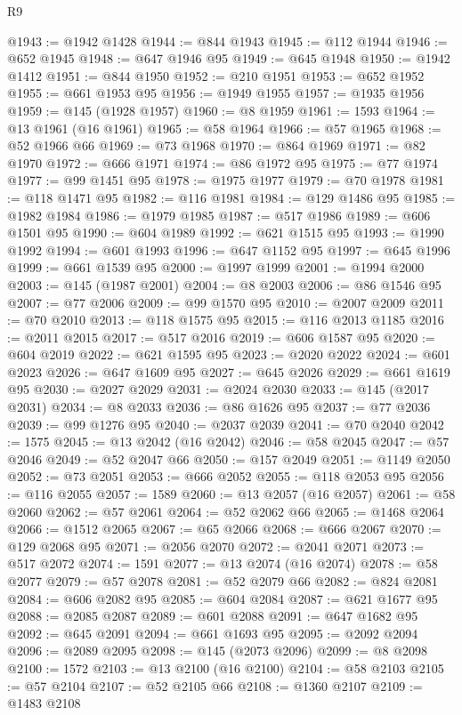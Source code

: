 \begin{lexlean}{R9}
\begin{coremodule}
@1943 := @1942 @1428
@1944 := @844 @1943
@1945 := @112 @1944
@1946 := @652 @1945
@1948 := @647 @1946 @95
@1949 := @645 @1948
@1950 := @1942 @1412
@1951 := @844 @1950
@1952 := @210 @1951
@1953 := @652 @1952
@1955 := @661 @1953 @95
@1956 := @1949 @1955
@1957 := @1935 @1956
@1959 := @145 (@1928 @1957)
@1960 := @8 @1959
@1961 := 1593
@1964 := @13 @1961 (@16 @1961)
@1965 := @58 @1964
@1966 := @57 @1965
@1968 := @52 @1966 @66
@1969 := @73 @1968
@1970 := @864 @1969
@1971 := @82 @1970
@1972 := @666 @1971
@1974 := @86 @1972 @95
@1975 := @77 @1974
@1977 := @99 @1451 @95
@1978 := @1975 @1977
@1979 := @70 @1978
@1981 := @118 @1471 @95
@1982 := @116 @1981
@1984 := @129 @1486 @95
@1985 := @1982 @1984
@1986 := @1979 @1985
@1987 := @517 @1986
@1989 := @606 @1501 @95
@1990 := @604 @1989
@1992 := @621 @1515 @95
@1993 := @1990 @1992
@1994 := @601 @1993
@1996 := @647 @1152 @95
@1997 := @645 @1996
@1999 := @661 @1539 @95
@2000 := @1997 @1999
@2001 := @1994 @2000
@2003 := @145 (@1987 @2001)
@2004 := @8 @2003
@2006 := @86 @1546 @95
@2007 := @77 @2006
@2009 := @99 @1570 @95
@2010 := @2007 @2009
@2011 := @70 @2010
@2013 := @118 @1575 @95
@2015 := @116 @2013 @1185
@2016 := @2011 @2015
@2017 := @517 @2016
@2019 := @606 @1587 @95
@2020 := @604 @2019
@2022 := @621 @1595 @95
@2023 := @2020 @2022
@2024 := @601 @2023
@2026 := @647 @1609 @95
@2027 := @645 @2026
@2029 := @661 @1619 @95
@2030 := @2027 @2029
@2031 := @2024 @2030
@2033 := @145 (@2017 @2031)
@2034 := @8 @2033
@2036 := @86 @1626 @95
@2037 := @77 @2036
@2039 := @99 @1276 @95
@2040 := @2037 @2039
@2041 := @70 @2040
@2042 := 1575
@2045 := @13 @2042 (@16 @2042)
@2046 := @58 @2045
@2047 := @57 @2046
@2049 := @52 @2047 @66
@2050 := @157 @2049
@2051 := @1149 @2050
@2052 := @73 @2051
@2053 := @666 @2052
@2055 := @118 @2053 @95
@2056 := @116 @2055
@2057 := 1589
@2060 := @13 @2057 (@16 @2057)
@2061 := @58 @2060
@2062 := @57 @2061
@2064 := @52 @2062 @66
@2065 := @1468 @2064
@2066 := @1512 @2065
@2067 := @65 @2066
@2068 := @666 @2067
@2070 := @129 @2068 @95
@2071 := @2056 @2070
@2072 := @2041 @2071
@2073 := @517 @2072
@2074 := 1591
@2077 := @13 @2074 (@16 @2074)
@2078 := @58 @2077
@2079 := @57 @2078
@2081 := @52 @2079 @66
@2082 := @824 @2081
@2084 := @606 @2082 @95
@2085 := @604 @2084
@2087 := @621 @1677 @95
@2088 := @2085 @2087
@2089 := @601 @2088
@2091 := @647 @1682 @95
@2092 := @645 @2091
@2094 := @661 @1693 @95
@2095 := @2092 @2094
@2096 := @2089 @2095
@2098 := @145 (@2073 @2096)
@2099 := @8 @2098
@2100 := 1572
@2103 := @13 @2100 (@16 @2100)
@2104 := @58 @2103
@2105 := @57 @2104
@2107 := @52 @2105 @66
@2108 := @1360 @2107
@2109 := @1483 @2108

\end{coremodule}
\end{lexlean}
